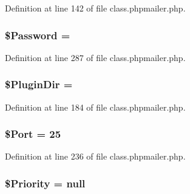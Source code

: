 Definition at line 142 of file class.\+phpmailer.\+php.

\subsubsection[{\texorpdfstring{\$\+Password}{$Password}}]{\setlength{\rightskip}{0pt plus 5cm}\$Password = \textquotesingle{}\textquotesingle{}}\hypertarget{class_p_h_p_mailer_ae3ac8512c0fd8924c7112671ead08cf7}{}\label{class_p_h_p_mailer_ae3ac8512c0fd8924c7112671ead08cf7}


Definition at line 287 of file class.\+phpmailer.\+php.

\subsubsection[{\texorpdfstring{\$\+Plugin\+Dir}{$PluginDir}}]{\setlength{\rightskip}{0pt plus 5cm}\$Plugin\+Dir = \textquotesingle{}\textquotesingle{}}\hypertarget{class_p_h_p_mailer_a80c30e6b011ed425f82610685c961df7}{}\label{class_p_h_p_mailer_a80c30e6b011ed425f82610685c961df7}


Definition at line 184 of file class.\+phpmailer.\+php.

\subsubsection[{\texorpdfstring{\$\+Port}{$Port}}]{\setlength{\rightskip}{0pt plus 5cm}\$Port = 25}\hypertarget{class_p_h_p_mailer_a3e9844389378050f7a95b67b329edf90}{}\label{class_p_h_p_mailer_a3e9844389378050f7a95b67b329edf90}


Definition at line 236 of file class.\+phpmailer.\+php.

\subsubsection[{\texorpdfstring{\$\+Priority}{$Priority}}]{\setlength{\rightskip}{0pt plus 5cm}\$Priority = null}\hypertarget{class_p_h_p_mailer_a7c6546640ba3eafd143d8f0e6805de27}{}\label{class_p_h_p_mailer_a7c6546640ba3eafd143d8f0e6805de27}


